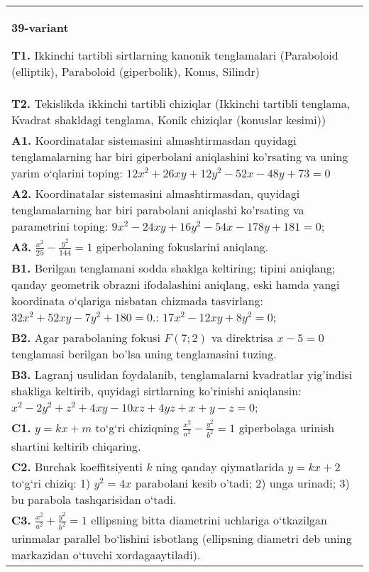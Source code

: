 \documentclass{article}
\begin{document}
\begin{tabular}{m{17cm}}
\textbf{39-variant}
\newline

\textbf{T1.} Ikkinchi tartibli sirtlarning kanonik tenglamalari (Paraboloid (elliptik), Paraboloid (giperbolik), Konus, Silindr) \\
\textbf{T2.} Tekislikda ikkinchi tartibli chiziqlar (Ikkinchi tartibli tenglama, Kvadrat shakldagi tenglama, Konik chiziqlar (konuslar kesimi)) \\
\textbf{A1.} Koordinatalar sistemasini almashtirmasdan quyidagi tenglamalarning har biri giperbolani aniqlashini ko'rsating va uning yarim o‘qlarini toping: $12 x^2+26 x y+12 y^2-52 x-48 y+73=0$ \\
\textbf{A2.} Koordinatalar sistemasini almashtirmasdan, quyidagi tenglamalarning har biri parabolani aniqlashi ko'rsating va parametrini toping: $9 x^2-24 x y+16 y^2-54 x-178 y+181=0$; \\
\textbf{A3.} $\frac{x^2}{25}-\frac{y^2}{144}=1$ giperbolaning fokuslarini aniqlang. \\
\textbf{B1.} Berilgan tenglamani sodda shaklga keltiring; tipini aniqlang; qanday geometrik obrazni ifodalashini aniqlang, eski hamda yangi koordinata o‘qlariga nisbatan chizmada tasvirlang: $32x^2+52xy-7y^2+180=0$.: $17 x^2-12 x y+8 y^2=0$; \\
\textbf{B2.} Agar parabolaning fokusi $F (7; 2) $ va direktrisa $x-5=0$ tenglamasi berilgan bo'lsa uning tenglamasini tuzing. \\
\textbf{B3.} Lagranj usulidan foydalanib, tenglamalarni kvadratlar yig'indisi shakliga keltirib, quyidagi sirtlarning ko'rinishi aniqlansin: $x^2-2 y^2+z^2+4 x y-10 x z+4 y z+x+y-z=0$; \\
\textbf{C1.} $y=k x+m$ to‘g‘ri chiziqning $\frac{x^2}{a^2}-\frac{y^2}{b^2}=1$ giperbolaga urinish shartini keltirib chiqaring. \\
\textbf{C2.} Burchak koeffitsiyenti $k$ ning qanday qiymatlarida $y=kx+2$ to‘g‘ri chiziq: 1) $y^2=4x$ parabolani kesib o'tadi; 2) unga urinadi; 3) bu parabola tashqarisidan o‘tadi. \\
\textbf{C3.} $\frac{x^2}{a^2}+\frac{y^2}{b^2}=1$ ellipsning bitta diametrini uchlariga o‘tkazilgan urinmalar parallel bo‘lishini isbotlang (ellipsning diametri deb uning markazidan o‘tuvchi xordagaaytiladi). \\

\end{tabular}
\vspace{1cm}
\end{document}
